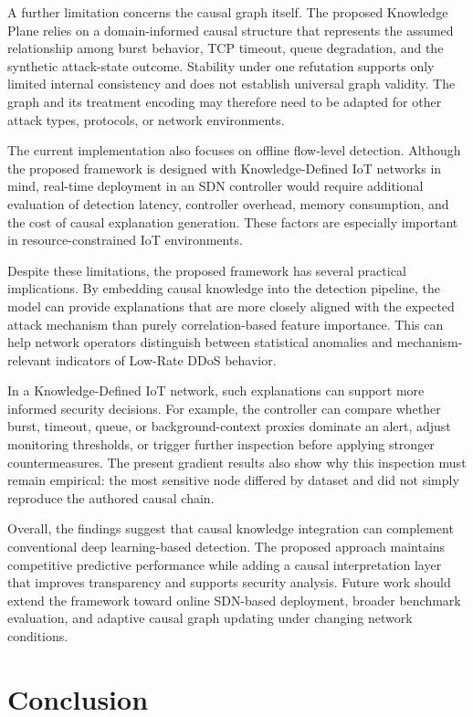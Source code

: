 \documentclass[journal]{IEEEtran}
\begin{document}
A further limitation concerns the causal graph itself. The proposed Knowledge Plane relies on a domain-informed causal structure that represents the assumed relationship among burst behavior, TCP timeout, queue degradation, and the synthetic attack-state outcome. Stability under one refutation supports only limited internal consistency and does not establish universal graph validity. The graph and its treatment encoding may therefore need to be adapted for other attack types, protocols, or network environments.

The current implementation also focuses on offline flow-level detection. Although the proposed framework is designed with Knowledge-Defined IoT networks in mind, real-time deployment in an SDN controller would require additional evaluation of detection latency, controller overhead, memory consumption, and the cost of causal explanation generation. These factors are especially important in resource-constrained IoT environments.

Despite these limitations, the proposed framework has several practical implications. By embedding causal knowledge into the detection pipeline, the model can provide explanations that are more closely aligned with the expected attack mechanism than purely correlation-based feature importance. This can help network operators distinguish between statistical anomalies and mechanism-relevant indicators of Low-Rate DDoS behavior.

In a Knowledge-Defined IoT network, such explanations can support more informed security decisions. For example, the controller can compare whether burst, timeout, queue, or background-context proxies dominate an alert, adjust monitoring thresholds, or trigger further inspection before applying stronger countermeasures. The present gradient results also show why this inspection must remain empirical: the most sensitive node differed by dataset and did not simply reproduce the authored causal chain.

Overall, the findings suggest that causal knowledge integration can complement conventional deep learning-based detection. The proposed approach maintains competitive predictive performance while adding a causal interpretation layer that improves transparency and supports security analysis. Future work should extend the framework toward online SDN-based deployment, broader benchmark evaluation, and adaptive causal graph updating under changing network conditions.

\section{Conclusion}
\label{sec:conclusion}
\end{document}
